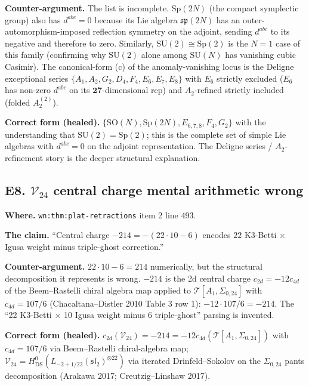 \textbf{Counter-argument.} The list is incomplete. $\mathrm{Sp}(2N)$
(the compact symplectic group) also has $d^{abc} = 0$ because its
Lie algebra $\mathfrak{sp}(2N)$ has an outer-automorphism-imposed
reflection symmetry on the adjoint, sending $d^{abc}$ to its negative
and therefore to zero. Similarly, $\mathrm{SU}(2) \cong \mathrm{Sp}(2)$
is the $N = 1$ case of this family (confirming why $\mathrm{SU}(2)$
alone among $\mathrm{SU}(N)$ has vanishing cubic Casimir). The
canonical-form (c) of the anomaly-vanishing locus is the Deligne
exceptional series $\{A_1, A_2, G_2, D_4, F_4, E_6, E_7, E_8\}$ with
$E_6$ strictly excluded ($E_6$ has non-zero $d^{abc}$ on its
$\mathbf{27}$-dimensional rep) and $A_2$-refined strictly included
(folded $A_2^{(2)}$).

\textbf{Correct form (healed).} $\{\mathrm{SO}(N), \mathrm{Sp}(2N),
E_{6, 7, 8}, F_4, G_2\}$ with the understanding that
$\mathrm{SU}(2) = \mathrm{Sp}(2)$; this is the complete set of simple
Lie algebras with $d^{abc} = 0$ on the adjoint representation. The
Deligne series / $A_2$-refinement story is the deeper structural
explanation.

\subsection*{E8. $\mathcal V_{24}$ central charge mental arithmetic
wrong}
\label{wn:subsec:E8-V24-central-charge}

\textbf{Where.} \verb|wn:thm:plat-retractions| item 2 line 493.

\textbf{The claim.} ``Central charge $-214 = -(22 \cdot 10 - 6)$ encodes
$22$ K3-Betti $\times$ Igusa weight minus triple-ghost correction.''

\textbf{Counter-argument.} $22 \cdot 10 - 6 = 214$ numerically, but the
structural decomposition it represents is wrong. $-214$ is the 2d
central charge $c_{2d} = -12 c_{4d}$ of the Beem--Rastelli chiral
algebra map applied to $\mathcal T[A_1, \Sigma_{0, 24}]$ with
$c_{4d} = 107/6$ (Chacaltana--Distler 2010 Table 3 row 1):
$-12 \cdot 107/6 = -214$. The ``22 K3-Betti $\times$ 10 Igusa weight
minus 6 triple-ghost'' parsing is invented.

\textbf{Correct form (healed).} $c_{2d}(\mathcal V_{24}) = -214
= -12 c_{4d}(\mathcal T[A_1, \Sigma_{0, 24}])$ with
$c_{4d} = 107/6$ via Beem--Rastelli chiral-algebra map;
$\mathcal V_{24} = H^0_{\mathrm{DS}}(L_{-2 + 1/22}(\mathfrak{sl}_2)^{\otimes 22})$
via iterated Drinfeld--Sokolov on the $\Sigma_{0, 24}$ pants
decomposition (Arakawa 2017; Creutzig--Linshaw 2017).


